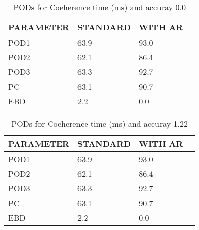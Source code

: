 \documentclass[11pt,english]{article}
\begin{document}
\begin{table}[]
\begin{center}
\begin{tabular}{|l|l|l|l|}
\hline
\multicolumn{1}{|c|}{\cellcolor[HTML]{C0C0C0}\textbf{PARAMETER}} & \multicolumn{1}{c|}{\cellcolor[HTML]{C0C0C0}\textbf{STANDARD}} & \multicolumn{1}{c|}{\cellcolor[HTML]{C0C0C0}\textbf{WITH AR}} \\
\hline
\cellcolor[HTML]{C0C0C0}POD1  & 63.9                                & 93.0         \\
\cellcolor[HTML]{C0C0C0}POD2  & 62.1                                & 86.4         \\
\cellcolor[HTML]{C0C0C0}POD3  & 63.3                                & 92.7         \\
\cellcolor[HTML]{C0C0C0}PC    & 63.1                                  & 90.7           \\
\cellcolor[HTML]{C0C0C0}EBD   & 2.2                                 & 0.0          \\
\hline
\end{tabular}
\caption{PODs for Coeherence time (ms) and accuray 0.0}
\end{center}
\end{table}
\begin{table}[]
\begin{center}
\begin{tabular}{|l|l|l|l|}
\hline
\multicolumn{1}{|c|}{\cellcolor[HTML]{C0C0C0}\textbf{PARAMETER}} & \multicolumn{1}{c|}{\cellcolor[HTML]{C0C0C0}\textbf{STANDARD}} & \multicolumn{1}{c|}{\cellcolor[HTML]{C0C0C0}\textbf{WITH AR}} \\
\hline
\cellcolor[HTML]{C0C0C0}POD1  & 63.9                                & 93.0         \\
\cellcolor[HTML]{C0C0C0}POD2  & 62.1                                & 86.4         \\
\cellcolor[HTML]{C0C0C0}POD3  & 63.3                                & 92.7         \\
\cellcolor[HTML]{C0C0C0}PC    & 63.1                                  & 90.7           \\
\cellcolor[HTML]{C0C0C0}EBD   & 2.2                                 & 0.0          \\
\hline
\end{tabular}
\caption{PODs for Coeherence time (ms) and accuray 1.22}
\end{center}
\end{table}
\end{document}
